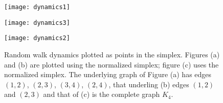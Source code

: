 \begin{figure}
	\centering
	\begin{minipage}{0.32\textwidth}
		\centering
		\texttt{[image: dynamics1]}
		\subcaption{}
	\end{minipage}
	\begin{minipage}{0.32\textwidth}
		\centering
		\texttt{[image: dynamics3]}
		\subcaption{}
	\end{minipage}
	\begin{minipage}{0.32\textwidth}
		\centering
		\texttt{[image: dynamics2]}
		\subcaption{}
	\end{minipage}
	\caption{Random walk dynamics plotted as points  in the simplex. Figures (a) and (b) are plotted using the normalized simplex;  figure (c) uses  the normalized simplex. The  underlying graph of Figure (a) has edges $(1,2)$, $(2,3)$, $(3,4)$, $(2,4)$, that underling (b) edges $(1,2)$ and $(2,3)$ and that of (c) is the complete graph  $K_4$. }
	\label{fig:random_walk}
\end{figure}

